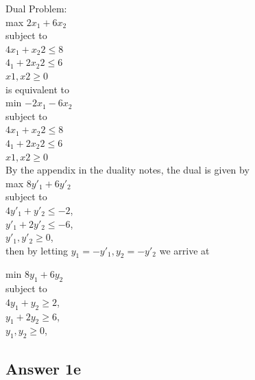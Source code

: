 \documentclass[twoside]{article}
\begin{document}
Dual Problem: \\

max $2x_{1} + 6x_{2}$ \\
subject to\\
$4x_{1} + x_2{2} \leq 8 $\\
$4_{1} + 2x_2{2} \leq 6 $\\
$x1,x2 \geq 0 $\\
is equivalent to\\

min $-2x_{1} - 6x_{2}$ \\
subject to\\
$4x_{1} + x_2{2} \leq 8 $\\
$4_{1} + 2x_2{2} \leq 6 $\\
$x1,x2 \geq 0 $\\

By the appendix in the duality notes, the dual is given by\\

max $8y'_{1} + 6y'_{2}$\\
subject to\\
$4y'_{1} + y'_{2} \leq -2$,\\
$y'_{1} + 2y'_{2} \leq -6$,\\
$y'_{1}, y'_{2} \geq 0$,\\
then by letting $y_{1} = -y'_{1},y_{2} = -y'_{2}$
we arrive at 

min $8y_{1} + 6y_{2}$\\
subject to\\
$4y_{1} + y_{2} \geq 2$,\\
$y_{1} + 2y_{2} \geq 6$,\\
$y_{1}, y_{2} \geq 0$,\\

\subsection{Answer 1e}
\end{document}
